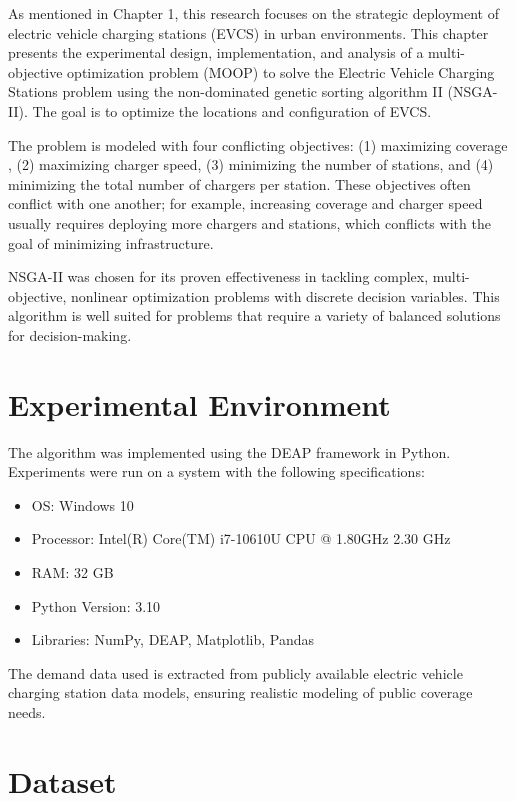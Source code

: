 
As mentioned in Chapter 1, this research focuses on the strategic deployment of electric vehicle charging stations (EVCS) in urban environments. This chapter presents the experimental design, implementation, and analysis of a multi-objective optimization problem (MOOP) to solve the Electric Vehicle Charging Stations problem using the non-dominated genetic sorting algorithm II (NSGA-II). The goal is to optimize the locations and configuration of EVCS.

The problem is modeled with four conflicting objectives: (1) maximizing coverage , (2) maximizing charger speed, (3) minimizing the number of stations, and (4) minimizing the total number of chargers per station. These objectives often conflict with one another; for example, increasing coverage and charger speed usually requires deploying more chargers and stations, which conflicts with the goal of minimizing infrastructure.

NSGA-II was chosen for its proven effectiveness in tackling complex, multi-objective, nonlinear optimization problems with discrete decision variables. This algorithm is well suited for problems that require a variety of balanced solutions for decision-making.

\section{Experimental Environment}

The algorithm was implemented using the DEAP framework in Python. Experiments were run on a system with the following specifications:

\begin{itemize}
    \item OS: Windows 10
    \item Processor: Intel(R) Core(TM) i7-10610U CPU @ 1.80GHz   2.30 GHz
    \item RAM: 32 GB
    \item Python Version: 3.10
    \item Libraries: NumPy, DEAP, Matplotlib, Pandas
\end{itemize}

The demand data used is extracted from publicly available electric vehicle charging station data models, ensuring realistic modeling of public coverage needs.



\section{Dataset}
